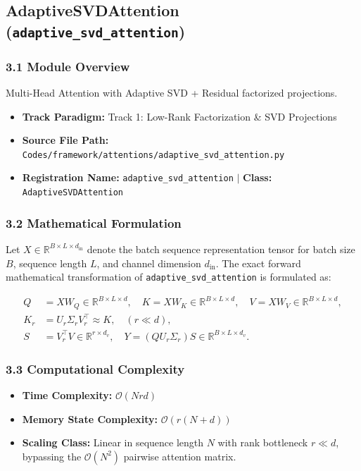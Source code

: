 \subsection{AdaptiveSVDAttention (\texttt{adaptive\_svd\_attention})}
\label{sec:app_module_adaptive_svd_attention}

\subsubsection*{3.1 Module Overview}
Multi-Head Attention with Adaptive SVD + Residual factorized projections.
\begin{itemize}
    \item \textbf{Track Paradigm:} Track 1: Low-Rank Factorization \& SVD Projections
    \item \textbf{Source File Path:} \texttt{Codes/framework/attentions/adaptive\_svd\_attention.py}
    \item \textbf{Registration Name:} \texttt{adaptive\_svd\_attention} $\mid$ \textbf{Class:} \texttt{AdaptiveSVDAttention}
\end{itemize}

\subsubsection*{3.2 Mathematical Formulation}
Let $X \in \mathbb{R}^{B \times L \times d_{\text{in}}}$ denote the batch sequence representation tensor for batch size $B$, sequence length $L$, and channel dimension $d_{\text{in}}$. The exact forward mathematical transformation of \texttt{adaptive\_svd\_attention} is formulated as:

\begin{align}
Q &= X W_Q \in \mathbb{R}^{B \times L \times d}, \quad K = X W_K \in \mathbb{R}^{B \times L \times d}, \quad V = X W_V \in \mathbb{R}^{B \times L \times d}, \\
K_r &= U_r \Sigma_r V_r^\top \approx K, \quad (r \ll d), \\
S &= V_r^\top V \in \mathbb{R}^{r \times d_v}, \quad Y = (Q U_r \Sigma_r) S \in \mathbb{R}^{B \times L \times d_v}.
\end{align}


\subsubsection*{3.3 Computational Complexity}
\begin{itemize}
    \item \textbf{Time Complexity:} $\mathcal{O}(N r d)$
    \item \textbf{Memory State Complexity:} $\mathcal{O}(r(N + d))$
    \item \textbf{Scaling Class:} Linear in sequence length $N$ with rank bottleneck $r \ll d$, bypassing the $\mathcal{O}(N^2)$ pairwise attention matrix.
\end{itemize}


